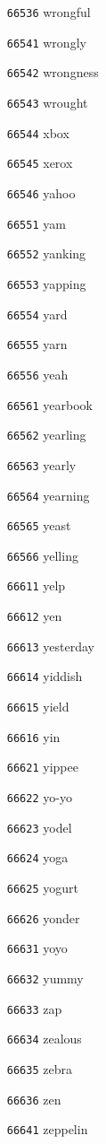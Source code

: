 \documentclass[twoside,11pt]{article}
\begin{document}
\begin{multicols}{5}
\begin{enumerate}
\item[\texttt{66536}] wrongful
\item[\texttt{66541}] wrongly
\item[\texttt{66542}] wrongness
\item[\texttt{66543}] wrought
\item[\texttt{66544}] xbox
\item[\texttt{66545}] xerox
\item[\texttt{66546}] yahoo
\item[\texttt{66551}] yam
\item[\texttt{66552}] yanking
\item[\texttt{66553}] yapping
\item[\texttt{66554}] yard
\item[\texttt{66555}] yarn
\item[\texttt{66556}] yeah
\item[\texttt{66561}] yearbook
\item[\texttt{66562}] yearling
\item[\texttt{66563}] yearly
\item[\texttt{66564}] yearning
\item[\texttt{66565}] yeast
\item[\texttt{66566}] yelling
\item[\texttt{66611}] yelp
\item[\texttt{66612}] yen
\item[\texttt{66613}] yesterday
\item[\texttt{66614}] yiddish
\item[\texttt{66615}] yield
\item[\texttt{66616}] yin
\item[\texttt{66621}] yippee
\item[\texttt{66622}] yo-yo
\item[\texttt{66623}] yodel
\item[\texttt{66624}] yoga
\item[\texttt{66625}] yogurt
\item[\texttt{66626}] yonder
\item[\texttt{66631}] yoyo
\item[\texttt{66632}] yummy
\item[\texttt{66633}] zap
\item[\texttt{66634}] zealous
\item[\texttt{66635}] zebra
\item[\texttt{66636}] zen
\item[\texttt{66641}] zeppelin

\end{enumerate}
\end{multicols}
\end{document}
